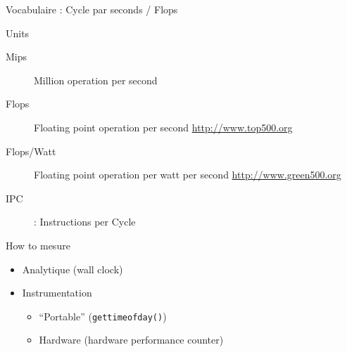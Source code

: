 \begin{Frame}{Vocabulaire : Cycle par seconds / Flops}

  \begin{block}{Units}
  \begin{description}
  \item[Mips] Million operation per second
  \item[Flops] Floating point operation per second \url{http://www.top500.org}
  \item[Flops/Watt] Floating point operation per watt per second  \url{http://www.green500.org}
  \item[IPC] :  Instructions per Cycle
  \end{description}
  \end{block}
  \begin{block}{How to mesure}
  \begin{itemize}
  \item Analytique (wall clock)
  \item Instrumentation 
    \begin{itemize}
    \item ``Portable'' (\texttt{gettimeofday()})
    \item Hardware (hardware performance counter)
    \end{itemize}
  \end{itemize}
  \end{block}
\end{Frame}


